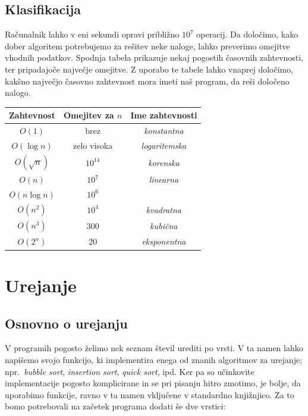 \documentclass{book}
\begin{document}
\newpage
\section{Klasifikacija}

Računalnik lahko v eni sekundi opravi približno \(10^7\) operacij. Da določimo,
kako dober algoritem potrebujemo za rešitev neke naloge, lahko preverimo
omejitve vhodnih podatkov. Spodnja tabela prikazuje nekaj pogostih časovnih
zahtevnosti, ter pripadajoče največje omejitve. Z uporabo te tabele lahko
vnaprej določimo, kakšno največjo časovno zahtevnost mora imeti naš program,
da reši določeno nalogo.

\begin{table}[h!]
  \centering
  \begin{tabular}{|c|c|c|}
	\hline
	Zahtevnost & Omejitev za \(n\) & Ime zahtevnosti \\
	\hline
	\(O(1)\) & brez & \emph{konstantna} \\
	\(O(\log n)\) & zelo visoka & \emph{logaritemska} \\
	\(O(\sqrt{n})\) & \(10^{14}\) & \emph{korenska} \\
	\(O(n)\) & \(10^7\) & \emph{linearna} \\
	\(O(n \log n)\) & \(10^6\) & \\
	\(O(n^2)\) & \(10^4\) & \emph{kvadratna} \\
	\(O(n^3)\) & \(300\) & \emph{kubična} \\
	\(O(2^n)\) & \(20\) & \emph{eksponentna} \\
	\hline
  \end{tabular}
\end{table}

\chapter{Urejanje}

\section{Osnovno o urejanju}

V programih pogosto želimo nek seznam števil urediti po vrsti.
V ta namen lahko napišemo svojo funkcijo, ki implementira enega od znanih
algoritmov za urejanje; npr.~\textit{bubble sort}, \textit{insertion sort},
\textit{quick sort}, ipd. Ker pa so učinkovite implementacije pogosto komplicirane
in se pri pisanju hitro zmotimo, je bolje, da uporabimo funkcije, ravno v ta
namen vključene v standardno knjižnjico. Za to bomo potrebovali na začetek
programa dodati še dve vrstici:
\end{document}
